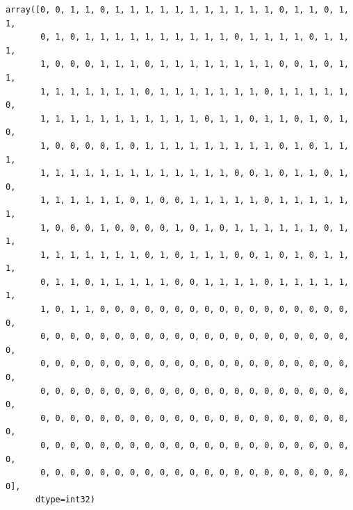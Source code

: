 \documentclass[
  11pt,
  letterpaper,
  DIV=11,
  numbers=noendperiod]{scrartcl}
\begin{document}
\begin{verbatim}
array([0, 0, 1, 1, 0, 1, 1, 1, 1, 1, 1, 1, 1, 1, 1, 1, 0, 1, 1, 0, 1, 1,
       0, 1, 0, 1, 1, 1, 1, 1, 1, 1, 1, 1, 1, 0, 1, 1, 1, 1, 0, 1, 1, 1,
       1, 0, 0, 0, 1, 1, 1, 0, 1, 1, 1, 1, 1, 1, 1, 1, 0, 0, 1, 0, 1, 1,
       1, 1, 1, 1, 1, 1, 1, 0, 1, 1, 1, 1, 1, 1, 1, 0, 1, 1, 1, 1, 1, 0,
       1, 1, 1, 1, 1, 1, 1, 1, 1, 1, 1, 0, 1, 1, 0, 1, 1, 0, 1, 0, 1, 0,
       1, 0, 0, 0, 0, 1, 0, 1, 1, 1, 1, 1, 1, 1, 1, 1, 0, 1, 0, 1, 1, 1,
       1, 1, 1, 1, 1, 1, 1, 1, 1, 1, 1, 1, 1, 0, 0, 1, 0, 1, 1, 0, 1, 0,
       1, 1, 1, 1, 1, 1, 0, 1, 0, 0, 1, 1, 1, 1, 1, 0, 1, 1, 1, 1, 1, 1,
       1, 0, 0, 0, 1, 0, 0, 0, 0, 1, 0, 1, 0, 1, 1, 1, 1, 1, 1, 0, 1, 1,
       1, 1, 1, 1, 1, 1, 1, 0, 1, 0, 1, 1, 1, 0, 0, 1, 0, 1, 0, 1, 1, 1,
       0, 1, 1, 0, 1, 1, 1, 1, 1, 0, 0, 1, 1, 1, 1, 0, 1, 1, 1, 1, 1, 1,
       1, 0, 1, 1, 0, 0, 0, 0, 0, 0, 0, 0, 0, 0, 0, 0, 0, 0, 0, 0, 0, 0,
       0, 0, 0, 0, 0, 0, 0, 0, 0, 0, 0, 0, 0, 0, 0, 0, 0, 0, 0, 0, 0, 0,
       0, 0, 0, 0, 0, 0, 0, 0, 0, 0, 0, 0, 0, 0, 0, 0, 0, 0, 0, 0, 0, 0,
       0, 0, 0, 0, 0, 0, 0, 0, 0, 0, 0, 0, 0, 0, 0, 0, 0, 0, 0, 0, 0, 0,
       0, 0, 0, 0, 0, 0, 0, 0, 0, 0, 0, 0, 0, 0, 0, 0, 0, 0, 0, 0, 0, 0,
       0, 0, 0, 0, 0, 0, 0, 0, 0, 0, 0, 0, 0, 0, 0, 0, 0, 0, 0, 0, 0, 0,
       0, 0, 0, 0, 0, 0, 0, 0, 0, 0, 0, 0, 0, 0, 0, 0, 0, 0, 0, 0, 0, 0],
      dtype=int32)
\end{verbatim}
\end{document}
